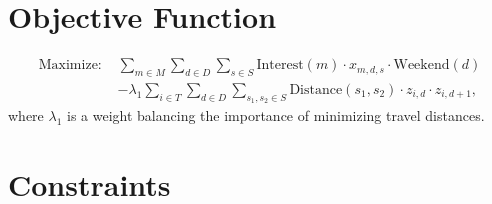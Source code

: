 \documentclass[a4paper, 12pt]{article}
\begin{document}
\section*{Objective Function}
\begin{align*}
\text{Maximize: } & \sum_{m \in M} \sum_{d \in D} \sum_{s \in S} \text{Interest}(m) \cdot x_{m,d,s} \cdot \text{Weekend}(d) \\
& - \lambda_1 \sum_{i \in T} \sum_{d \in D} \sum_{s_1, s_2 \in S} \text{Distance}(s_1, s_2) \cdot z_{i,d} \cdot z_{i,d+1},
\end{align*}
where $\lambda_1$ is a weight balancing the importance of minimizing travel distances.

\section*{Constraints}
\end{document}
